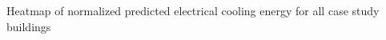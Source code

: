 Heatmap of normalized predicted electrical cooling energy for all case study buildings
\label{fig:cooling_heatmap}